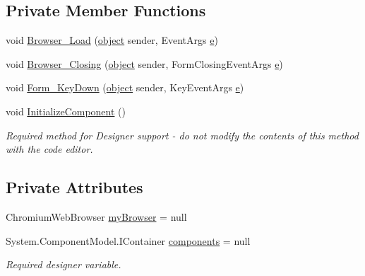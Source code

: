 \subsection*{Private Member Functions}
\begin{DoxyCompactItemize}
\item 
void \hyperlink{class_web_analyzer_1_1_u_i_1_1_experiment_wizard_aeb5104fe8972a764582545e57feb047c}{Browser\+\_\+\+Load} (\hyperlink{_u_i_2_h_t_m_l_resources_2js_2lib_2underscore_8min_8js_aae18b7515bb2bc4137586506e7c0c903}{object} sender, Event\+Args \hyperlink{_u_i_2_h_t_m_l_resources_2js_2lib_2bootstrap_8min_8js_ab5902775854a8b8440bcd25e0fe1c120}{e})
\item 
void \hyperlink{class_web_analyzer_1_1_u_i_1_1_experiment_wizard_aedf3743b17679113da0a06e2449f2cba}{Browser\+\_\+\+Closing} (\hyperlink{_u_i_2_h_t_m_l_resources_2js_2lib_2underscore_8min_8js_aae18b7515bb2bc4137586506e7c0c903}{object} sender, Form\+Closing\+Event\+Args \hyperlink{_u_i_2_h_t_m_l_resources_2js_2lib_2bootstrap_8min_8js_ab5902775854a8b8440bcd25e0fe1c120}{e})
\item 
void \hyperlink{class_web_analyzer_1_1_u_i_1_1_experiment_wizard_a238485396ddbea1d5daff782924fda61}{Form\+\_\+\+Key\+Down} (\hyperlink{_u_i_2_h_t_m_l_resources_2js_2lib_2underscore_8min_8js_aae18b7515bb2bc4137586506e7c0c903}{object} sender, Key\+Event\+Args \hyperlink{_u_i_2_h_t_m_l_resources_2js_2lib_2bootstrap_8min_8js_ab5902775854a8b8440bcd25e0fe1c120}{e})
\item 
void \hyperlink{class_web_analyzer_1_1_u_i_1_1_experiment_wizard_ab3c6f752d514c5b4794b6e33f031b80b}{Initialize\+Component} ()
\begin{DoxyCompactList}\small\item\em Required method for Designer support -\/ do not modify the contents of this method with the code editor. \end{DoxyCompactList}\end{DoxyCompactItemize}
\subsection*{Private Attributes}
\begin{DoxyCompactItemize}
\item 
Chromium\+Web\+Browser \hyperlink{class_web_analyzer_1_1_u_i_1_1_experiment_wizard_a47b2b792a5aba1e3594b5ce6dca7156c}{my\+Browser} = null
\item 
System.\+Component\+Model.\+I\+Container \hyperlink{class_web_analyzer_1_1_u_i_1_1_experiment_wizard_abaa55aeb99b0ed9ef11725d650cec317}{components} = null
\begin{DoxyCompactList}\small\item\em Required designer variable. \end{DoxyCompactList}\end{DoxyCompactItemize}


